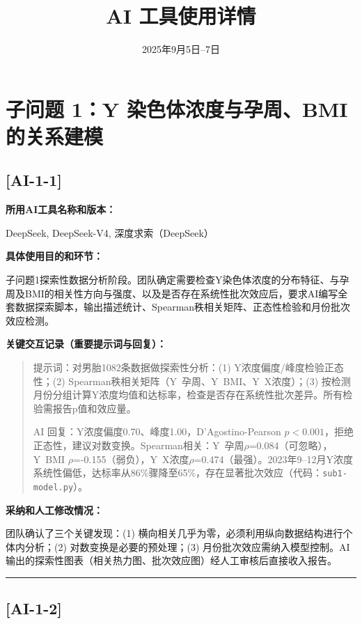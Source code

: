 \documentclass[12pt,a4paper]{ctexart}
\title{AI 工具使用详情}
\author{}
\date{2025年9月5日--7日}
\begin{document}
\maketitle

\section*{子问题 1：Y 染色体浓度与孕周、BMI 的关系建模}

\subsection*{[AI-1-1]}

\textbf{所用AI工具名称和版本：}

DeepSeek, DeepSeek-V4, 深度求索（DeepSeek）

\textbf{具体使用目的和环节：}

子问题1探索性数据分析阶段。团队确定需要检查Y染色体浓度的分布特征、与孕周及BMI的相关性方向与强度、以及是否存在系统性批次效应后，要求AI编写全套数据探索脚本，输出描述统计、Spearman秩相关矩阵、正态性检验和月份批次效应检测。

\textbf{关键交互记录（重要提示词与回复）：}

\begin{quote}
提示词：对男胎1082条数据做探索性分析：(1) Y浓度偏度/峰度检验正态性；(2) Spearman秩相关矩阵（Y~孕周、Y~BMI、Y~X浓度）；(3) 按检测月份分组计算Y浓度均值和达标率，检查是否存在系统性批次差异。所有检验需报告p值和效应量。

AI 回复：Y浓度偏度0.70、峰度1.00，D'Agostino-Pearson $p<0.001$，拒绝正态性，建议对数变换。Spearman相关：Y~孕周$\rho$=0.084（可忽略），Y~BMI $\rho$=-0.155（弱负），Y~X浓度$\rho$=0.474（最强）。2023年9--12月Y浓度系统性偏低，达标率从86\%骤降至65\%，存在显著批次效应（代码：\texttt{sub1-model.py}）。
\end{quote}

\textbf{采纳和人工修改情况：}

团队确认了三个关键发现：(1) 横向相关几乎为零，必须利用纵向数据结构进行个体内分析；(2) 对数变换是必要的预处理；(3) 月份批次效应需纳入模型控制。AI输出的探索性图表（相关热力图、批次效应图）经人工审核后直接收入报告。

\vspace{1em}
\hrule
\vspace{1em}

\subsection*{[AI-1-2]}
\end{document}

